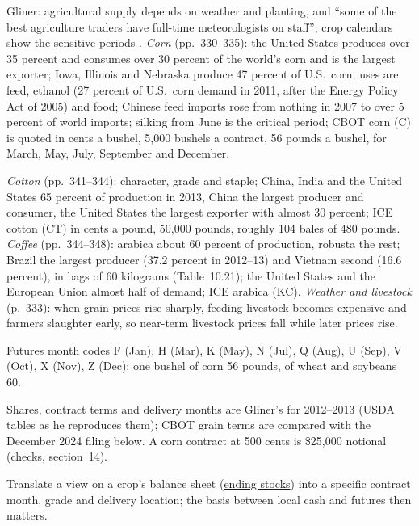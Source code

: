 \begin{qfdefinition}\label{def:agricultural-markets}
 Gliner: agricultural supply depends on weather and planting, and ``some of the best agriculture traders have full-time meteorologists on staff''; crop calendars show the sensitive periods \citep[chap.~10, sec.\ ``Agriculture'', PDF p.~330]{s7-gliner}. \emph{Corn} (pp.~330--335): the United States produces over 35 percent and consumes over 30 percent of the world's corn and is the largest exporter; Iowa, Illinois and Nebraska produce 47 percent of U.S.\ corn; uses are feed, ethanol (27 percent of U.S.\ corn demand in 2011, after the Energy Policy Act of 2005) and food; Chinese feed imports rose from nothing in 2007 to over 5 percent of world imports; silking from June is the critical period; CBOT corn (C) is quoted in cents a bushel, 5,000 bushels a contract, 56 pounds a bushel, for March, May, July, September and December.

\emph{Cotton} (pp.~341--344): character, grade and staple; China, India and the United States 65 percent of production in 2013, China the largest producer and consumer, the United States the largest exporter with almost 30 percent; ICE cotton (CT) in cents a pound, 50,000 pounds, roughly 104 bales of 480 pounds. \emph{Coffee} (pp.~344--348): arabica about 60 percent of production, robusta the rest; Brazil the largest producer (37.2 percent in 2012--13) and Vietnam second (16.6 percent), in bags of 60 kilograms (Table~10.21); the United States and the European Union almost half of demand; ICE arabica (KC). \emph{Weather and livestock} (p.~333): when grain prices rise sharply, feeding livestock becomes expensive and farmers slaughter early, so near-term livestock prices fall while later prices rise.

 Futures month codes F (Jan), H (Mar), K (May), N (Jul), Q (Aug), U (Sep), V (Oct), X (Nov), Z (Dec); one bushel of corn 56 pounds, of wheat and soybeans 60.

 Shares, contract terms and delivery months are Gliner's for 2012--2013 (USDA tables as he reproduces them); CBOT grain terms are compared with the December 2024 filing below. A corn contract at 500 cents is \$25,000 notional (checks, section~14).

 Translate a view on a crop's balance sheet (\hyperref[def:contango-backwardation-stocks]{ending stocks}) into a specific contract month, grade and delivery location; the basis between local cash and futures then matters.


\end{qfdefinition}
